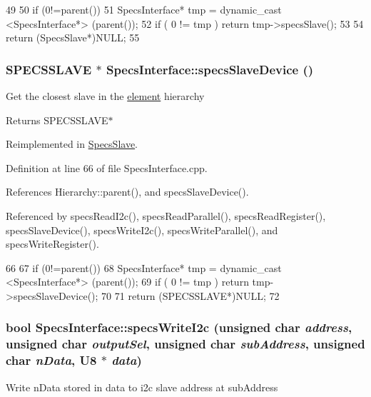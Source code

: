 \begin{DoxyCode}
49                                       {
50     if (0!=parent()){
51     SpecsInterface* tmp = dynamic_cast <SpecsInterface*> (parent());
52     if ( 0 != tmp ) return tmp->specsSlave();
53   }
54   return (SpecsSlave*)NULL; 
55 }
\end{DoxyCode}
\hypertarget{classSpecsInterface_ac8d4711197f484f055533ec1e5ae01a1}{
\subsubsection[{specsSlaveDevice}]{\setlength{\rightskip}{0pt plus 5cm}SPECSSLAVE $\ast$ SpecsInterface::specsSlaveDevice ()}}
\label{classSpecsInterface_ac8d4711197f484f055533ec1e5ae01a1}
Get the closest slave in the \hyperlink{namespaceelement}{element} hierarchy \begin{DoxyReturn}{Returns}
SPECSSLAVE$\ast$ 
\end{DoxyReturn}


Reimplemented in \hyperlink{classSpecsSlave_a44970aca61b6fdcd6d6d90e6601093f3}{SpecsSlave}.

Definition at line 66 of file SpecsInterface.cpp.

References Hierarchy::parent(), and specsSlaveDevice().

Referenced by specsReadI2c(), specsReadParallel(), specsReadRegister(), specsSlaveDevice(), specsWriteI2c(), specsWriteParallel(), and specsWriteRegister().


\begin{DoxyCode}
66                                             {
67     if (0!=parent()){
68     SpecsInterface* tmp = dynamic_cast <SpecsInterface*> (parent());
69     if ( 0 != tmp ) return tmp->specsSlaveDevice();
70     }
71   return (SPECSSLAVE*)NULL;
72 }
\end{DoxyCode}
\hypertarget{classSpecsInterface_ae208595624e222a9ff81d112dfbf5a97}{
\subsubsection[{specsWriteI2c}]{\setlength{\rightskip}{0pt plus 5cm}bool SpecsInterface::specsWriteI2c (unsigned char {\em address}, \/  unsigned char {\em outputSel}, \/  unsigned char {\em subAddress}, \/  unsigned char {\em nData}, \/  {\bf U8} $\ast$ {\em data})}}
\label{classSpecsInterface_ae208595624e222a9ff81d112dfbf5a97}
Write nData stored in data to i2c slave address at subAddress

